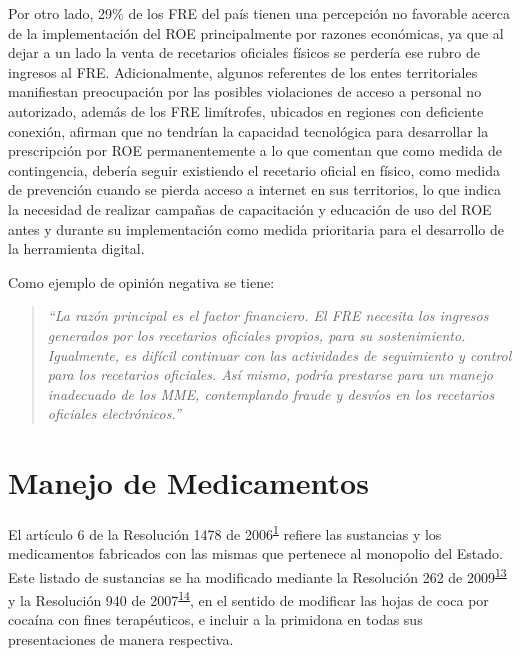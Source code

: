 \documentclass[
]{book}
\begin{document}
Por otro lado, 29\% de los FRE del país tienen una percepción no favorable acerca de la implementación del ROE principalmente por razones económicas, ya que al dejar a un lado la venta de recetarios oficiales físicos se perdería ese rubro de ingresos al FRE. Adicionalmente, algunos referentes de los entes territoriales manifiestan preocupación por las posibles violaciones de acceso a personal no autorizado, además de los FRE limítrofes, ubicados en regiones con deficiente conexión, afirman que no tendrían la capacidad tecnológica para desarrollar la prescripción por ROE permanentemente a lo que comentan que como medida de contingencia, debería seguir existiendo el recetario oficial en físico, como medida de prevención cuando se pierda acceso a internet en sus territorios, lo que indica la necesidad de realizar campañas de capacitación y educación de uso del ROE antes y durante su implementación como medida prioritaria para el desarrollo de la herramienta digital.

Como ejemplo de opinión negativa se tiene:

\begin{quote}
\emph{``La razón principal es el factor financiero. El FRE necesita los ingresos generados por los recetarios oficiales propios, para su sostenimiento. Igualmente, es difícil continuar con las actividades de seguimiento y control para los recetarios oficiales. Así mismo, podría prestarse para un manejo inadecuado de los MME, contemplando fraude y desvíos en los recetarios oficiales electrónicos.''}
\end{quote}

\hypertarget{manejo-de-medicamentos}{%
\chapter{Manejo de Medicamentos}\label{manejo-de-medicamentos}}


El artículo 6 de la Resolución 1478 de 2006\textsuperscript{\protect\hyperlink{ref-MSPS1478-2006}{1}} refiere las sustancias y los medicamentos fabricados con las mismas que pertenece al monopolio del Estado. Este listado de sustancias se ha modificado mediante la Resolución 262 de 2009\textsuperscript{\protect\hyperlink{ref-MSPS262-2009}{13}} y la Resolución 940 de 2007\textsuperscript{\protect\hyperlink{ref-MSPS940-2007}{14}}, en el sentido de modificar las hojas de coca por cocaína con fines terapéuticos, e incluir a la primidona en todas sus presentaciones de manera respectiva.
\end{document}
